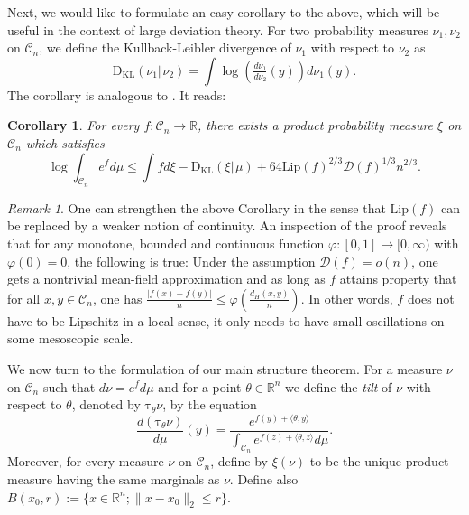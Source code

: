 \documentclass[12pt]{article}
\def \prodm{\xi}
\def \tilt{ \mathrm{\tau} }
\def \RR {\mathbb R}
\def \Lip {\mathrm {Lip}}
\def \DC {\mathcal{C}_n}
\def \KL {\mathrm{D}_{\mathrm{KL}}}
\def \Comp { \mathcal{D} }
\newtheorem{corollary}[theorem]{Corollary}
\theoremstyle{definition}
\theoremstyle{remark}
\newtheorem{remark}{Remark}
\begin{document}
Next, we would like to formulate an easy corollary to the above, which will be useful in the context of large deviation theory. For two probability measures $\nu_1,\nu_2$ on $\DC$, we define the Kullback-Leibler divergence of $\nu_1$ with respect to $\nu_2$ as
$$
\KL(\nu_1 \Vert \nu_2) = \int \log \left (\tfrac{d \nu_1}{d \nu_2} (y) \right ) d \nu_1(y).
$$
The corollary is analogous to \cite[Theorem 1.6]{CD14}. It reads:
\begin{corollary} \label{cor:main}
For every $f:\DC \to \RR$, there exists a \emph{product} probability measure $\xi$ on $\DC$ which satisfies
$$
\log \int_{\DC} e^{f} d \mu \leq \int f d \xi - \KL(\xi \Vert \mu) +  64 \Lip(f)^{2/3} \Comp(f)^{1/3} n^{2/3}.
$$
\end{corollary}
\begin{remark} \label{rem:continuity}
One can strengthen the above Corollary in the sense that $\Lip(f)$ can be replaced by a weaker notion of continuity. An inspection of the proof reveals that for any monotone, bounded and continuous function $\varphi:[0,1] \to [0,\infty)$ with $\varphi(0) = 0$, the following is true: Under the assumption $\Comp(f) = o(n)$, one gets a nontrivial mean-field approximation and as long as $f$ attains property that for all $x,y \in \DC$, one has $\frac{|f(x)-f(y)|}{n} \leq \varphi \left ( \frac{ d_H(x,y)}{n} \right )$. In other words, $f$ does not have to be Lipschitz in a local sense, it only needs to have small oscillations on some mesoscopic scale.
\end{remark}

We now turn to the formulation of our main structure theorem. For a measure $\nu$ on $\DC$ such that $d \nu = e^{f} d \mu$ and for a point $\theta \in \RR^n$ we define the \emph{tilt} of $\nu$ with respect to $\theta$, denoted by $\tilt_\theta \nu$, by the equation
$$
\frac{d (\tilt_\theta \nu)}{d \mu} (y) = \frac{ e^{f(y) + \langle \theta, y \rangle} }{ \int_{\DC} e^{f(z) + \langle \theta, z \rangle} d \mu }.
$$
Moreover, for every measure $\nu$ on $\DC$, define by $\prodm(\nu)$ to be the unique product measure having the same marginals as $\nu$. Define also $B(x_0,r) := \{x \in \RR^n; \|x-x_0\|_2 \leq r \}$.
\end{document}
